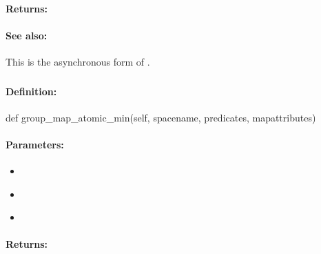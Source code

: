 \paragraph{Returns:}


\paragraph{See also:}  This is the asynchronous form of .

\pagebreak
\subsubsection{}
\label{api:python:group_map_atomic_min}


\paragraph{Definition:}
\begin{pythoncode}
def group_map_atomic_min(self, spacename, predicates, mapattributes)
\end{pythoncode}

\paragraph{Parameters:}
\begin{itemize}[noitemsep]
\item {}\\

\item {}\\

\item {}\\

\end{itemize}

\paragraph{Returns:}


